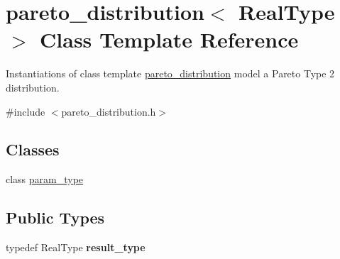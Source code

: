 \hypertarget{classpareto__distribution}{}\section{pareto\+\_\+distribution$<$ Real\+Type $>$ Class Template Reference}
\label{classpareto__distribution}


Instantiations of class template \mbox{\hyperlink{classpareto__distribution}{pareto\+\_\+distribution}} model a Pareto Type 2 distribution.  




{\ttfamily \#include $<$pareto\+\_\+distribution.\+h$>$}

\subsection*{Classes}
\begin{DoxyCompactItemize}
\item 
class \mbox{\hyperlink{classpareto__distribution_1_1param__type}{param\+\_\+type}}
\end{DoxyCompactItemize}
\subsection*{Public Types}
\begin{DoxyCompactItemize}
\item 
\mbox{\label{classpareto__distribution_ae0f18ad8753167df9c0acfe79578913e}} 
typedef Real\+Type {\bfseries result\+\_\+type}
\end{DoxyCompactItemize}
